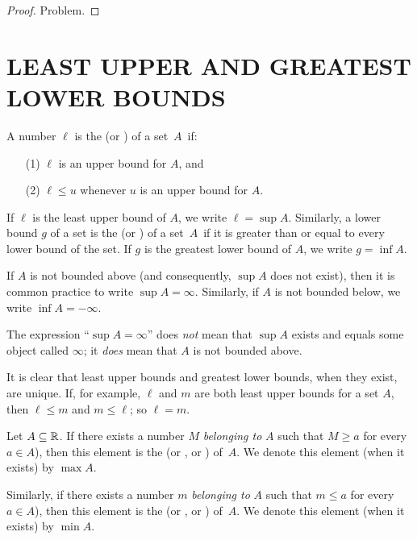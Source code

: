 \begin{proof} Problem.  \ns  \end{proof}







\section{LEAST UPPER AND GREATEST LOWER BOUNDS}
\begin{defn}  A number $\ell$ is the
(or
) of a set~$A$~if:
  \begin{enumerate}
   \item[(1)] $\ell$ is an upper bound for $A$, and
   \item[(2)] $\ell \le u$ whenever $u$ is an upper bound for $A$.
  \end{enumerate}
If $\ell$ is the least upper bound of $A$, we write
$\ell =\sup A$. Similarly, a lower bound $g$ of a set is the
(or
) of a set~$A$~if it is greater than or equal to every lower bound of
the set.  If $g$ is the greatest lower bound of $A$, we write
$g = \inf A$.

If $A$ is not bounded above (and consequently, $\sup A$ does not exist), then it is common
practice to write $\sup A = \infty$. Similarly, if $A$ is not bounded below, we write $\inf A
= -\infty$.
\end{defn}

\begin{cau}  The expression ``$\sup A = \infty$'' does \emph{not} mean that $\sup A$ exists and
equals some object called $\infty$; it \emph{does} mean that $A$ is not bounded above.
\end{cau}

It is clear that least upper bounds and greatest lower bounds, when they exist, are unique.
If, for example, $\ell$ and $m$ are both least upper bounds for a set $A$, then $\ell \le m$
and $m \le \ell$; so $\ell = m$.



\begin{defn} Let $A \subseteq \mathbb{R}$. If there exists a number $M$ \emph{belonging to} $A$ such
that $M \ge a$ for every $a \in A$), then this element is the
 (or
, or
) of~$A$.  We denote this element (when it exists)
by $\max A$.

 Similarly, if there exists a number $m$ \emph{belonging to} $A$ such that $m \le a$ for every
$a \in A$), then this element is the
 (or
, or
) of~$A$.  We denote this element (when it exists)
by $\min A$.
\end{defn}



